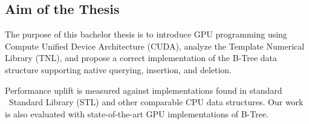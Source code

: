 \subsection{Aim of the Thesis}

The purpose of this bachelor thesis is to introduce GPU programming using Compute Unified Device Architecture (CUDA), analyze the Template Numerical Library (TNL), and propose a correct implementation of the B-Tree data structure supporting native querying, insertion, and deletion.

Performance uplift is measured against implementations found in standard \CC\ Standard Library (STL) and other comparable CPU data structures. Our work is also evaluated with state-of-the-art GPU implementations of B-Tree.

